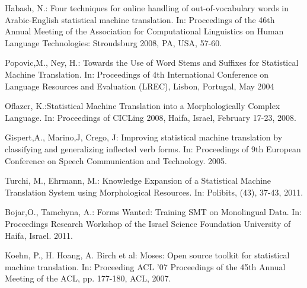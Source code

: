 \documentclass[11pt,letterpaper]{article}
\begin{document}
\begin{thebibliography}{} 


 Habash, N.: Four techniques for online handling of out-of-vocabulary words in 
Arabic-English statistical machine translation. In: Proceedings of the 46th Annual Meeting of 
the Association for Computational Linguistics on Human Language Technologies:
Stroudsburg 2008, PA, USA, 57-60.

 Popovic,M., Ney, H.: Towards the Use of Word Stems and Suffixes for Statistical Machine Translation. 
In: Proceedings of 4th International Conference on Language Resources and Evaluation (LREC), Lisbon, Portugal, May 2004 

 Oflazer, K.:Statistical Machine Translation into a Morphologically Complex Language. 
In: Proceedings of CICLing 2008, Haifa, Israel, February 17-23, 2008. 

 Gispert,A., Marino,J, Crego, J: Improving statistical machine translation by classifying and generalizing inflected verb forms.  
In: Proceedings of 9th European Conference on Speech Communication and Technology. 2005.

 Turchi, M., Ehrmann, M.: Knowledge Expansion of a Statistical Machine Translation System using Morphological Resources. 
In: Polibits, (43), 37-43, 2011.

 Bojar,O., Tamchyna, A.: Forms Wanted: Training SMT on Monolingual Data.
In: Proceedings Research Workshop of the Israel Science Foundation University of Haifa, Israel. 2011.

Koehn, P., H. Hoang, A. Birch et al: Moses: Open source toolkit for statistical machine translation.
In: Proceeding ACL '07 Proceedings of the 45th Annual Meeting of the ACL, pp. 177-180, ACL, 2007.

\end{thebibliography}
\end{document}
